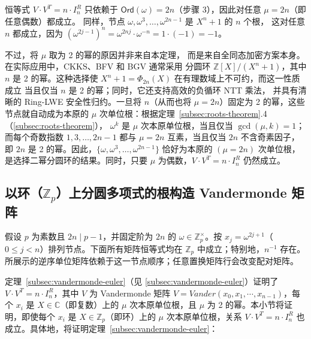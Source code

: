 恒等式 $V \cdot V^T = n \cdot I_n^R$ 只依赖于
$\textsf{Ord}(\omega) = 2n$（步骤 3），因此对任意 $\mu = 2n$（即任意偶数）都成立。
同样，节点 $\omega, \omega^3, \ldots, \omega^{2n-1}$ 是 $X^n + 1$ 的 $n$ 个根，
这对任意 $n$ 都成立，因为 $(\omega^{2j-1})^n = \omega^{2nj}\cdot\omega^{-n} = 1\cdot(-1) = -1$。

不过，将 $\mu$ 取为 2 的幂的原因并非来自本定理，
而是来自全同态加密方案本身。在实际应用中，CKKS、BFV 和 BGV 通常采用
分圆环 $\mathbb{Z}[X]/(X^n + 1)$，其中 $n$ 是 2 的幂。这种选择使 $X^n + 1 = \Phi_{2n}(X)$ 在有理数域上不可约，而这一性质成立
当且仅当 $n$ 是 2 的幂；同时，它还支持高效的负循环 NTT 乘法，
并具有清晰的 Ring-LWE 安全性归约。一旦将
$n$（从而也将 $\mu = 2n$）固定为 2 的幂，这些节点就自动成为本原的
$\mu$ 次单位根：根据定理~\ref*{subsec:roots-theorem}.4（\autoref{subsec:roots-theorem}），
$\omega^k$ 是 $\mu$ 次本原单位根，当且仅当 $\gcd(\mu, k) = 1$；而每个奇数指数
$1, 3, \ldots, 2n-1$ 都与 $\mu = 2n$ 互素，当且仅当 $2n$ 不含奇素因子，即 $2n$
是 2 的幂。因此，$\{\omega, \omega^3, \ldots, \omega^{2n-1}\}$ 恰好为本原的
$(\mu=2n)$ 次单位根，是选择二幂分圆环的结果。同时，只要 $\mu$ 为偶数，$V \cdot V^T = n \cdot I_n^R$ 仍然成立。



\subsection{以环（$\mathbb{Z}_p$）上分圆多项式的根构造 Vandermonde 矩阵}
\label{subsec:vandermonde-euler-integer-ring}

假设 $p$ 为素数且 $2n\mid p-1$，并固定阶为 $2n$ 的 $\omega\in\mathbb Z_p^\times$。按 $x_j=\omega^{2j+1}$（$0\le j<n$）排列节点。下面所有矩阵恒等式均在 $\mathbb Z_p$ 中成立；特别地，$n^{-1}$ 存在。所展示的逆序单位矩阵依赖于这一节点顺序；任意置换矩阵行会改变配对矩阵。

定理~\ref*{subsec:vandermonde-euler}（见 \autoref{subsec:vandermonde-euler}）证明了 $V \cdot V^T = n \cdot I^R_n$，其中 $V$ 为 Vandermonde 矩阵 $V = \mathit{Vander}(x_0, x_1, \cdots, x_{n-1})$，每个 $x_i$ 是 $X \in \mathbb{C}$（即复数）上的 $\mu$ 次本原单位根，且 $\mu$ 为 2 的幂。本小节将证明，即使每个 $x_i$ 是 $X \in \mathbb{Z}_p$（即环）上的 $\mu$ 次本原单位根，关系 $V \cdot V^T = n \cdot I^R_n$ 也成立。具体地，将证明定理~\ref*{subsec:vandermonde-euler}：


